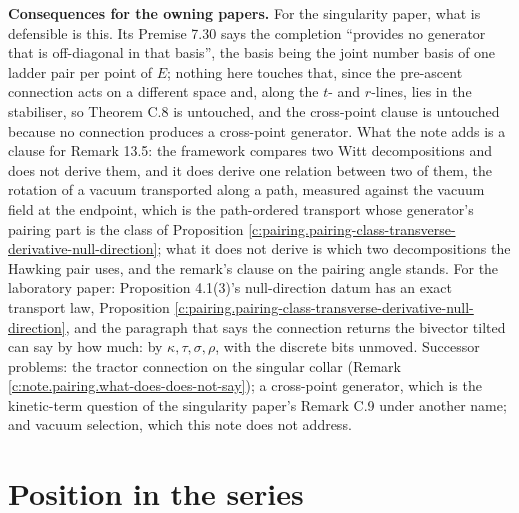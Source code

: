 \documentclass[11pt]{article}
\theoremstyle{definition}
\theoremstyle{plain}
\begin{document}
\label{c:note.pairing.setting-what-does-two-claims-5}
\textbf{Consequences for the owning papers.} For the singularity paper, what is defensible is this. Its Premise 7.30 says the completion ``provides no generator that is off-diagonal in that basis'', the basis being the joint number basis of one ladder pair per point of $E$; nothing here touches that, since the pre-ascent connection acts on a different space and, along the $t$- and $r$-lines, lies in the stabiliser, so Theorem C.8 is untouched, and the cross-point clause is untouched because no connection produces a cross-point generator. What the note adds is a clause for Remark 13.5: the framework compares two Witt decompositions and does not derive them, and it does derive one relation between two of them, the rotation of a vacuum transported along a path, measured against the vacuum field at the endpoint, which is the path-ordered transport whose generator's pairing part is the class of Proposition \ref{c:pairing.pairing-class-transverse-derivative-null-direction}; what it does not derive is which two decompositions the Hawking pair uses, and the remark's clause on the pairing angle stands. For the laboratory paper: Proposition 4.1(3)'s null-direction datum has an exact transport law, Proposition \ref{c:pairing.pairing-class-transverse-derivative-null-direction}, and the paragraph that says the connection returns the bivector tilted can say by how much: by $\kappa, \tau, \sigma, \rho$, with the discrete bits unmoved. Successor problems: the tractor connection on the singular collar (Remark \ref{c:note.pairing.what-does-does-not-say}); a cross-point generator, which is the kinetic-term question of the singularity paper's Remark C.9 under another name; and vacuum selection, which this note does not address.

\section{Position in the series}
\end{document}
